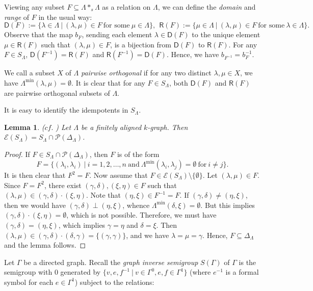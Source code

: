 \documentclass[a4paper,reqno,11pt]{amsart}
\numberwithin{equation}{section}
\newtheorem{lem}[thm]{Lemma}
\theoremstyle{definition}
\theoremstyle{remark}
\begin{document}
Viewing any subset $F\subseteq \Lambda *_s \Lambda$ as a relation on $\Lambda$, we can define the \emph{domain} and \emph{range} of $F$ in the usual way: \[\mathsf{D}(F):=\{\lambda\in \Lambda~|~(\lambda,\mu)\in F~\text{for some}~\mu\in \Lambda\},~~\mathsf{R}(F):=\{\mu\in \Lambda~|~(\lambda,\mu)\in F~\text{for some}~\lambda\in \Lambda\}.\] Observe that the map $b_F$, sending each element $\lambda\in \mathsf{D}(F)$ to the unique element $\mu\in \mathsf{R}(F)$ such that $(\lambda,\mu)\in F$, is a bijection from $\mathsf{D}(F)$ to $\mathsf{R}(F)$. For any $F\in S_\Lambda$, $\mathsf{D}(F^{-1})=\mathsf{R}(F)$ and $\mathsf{R}(F^{-1})=\mathsf{D}(F)$. Hence, we have $b_{F^{-1}}=b_F^{-1}$. 

We call a subset $X$ of $\Lambda$ \emph{pairwise orthogonal} if for any two distinct $\lambda,\mu\in X$, we have $\Lambda^{\min}(\lambda,\mu)=\emptyset$. It is clear that for any $F\in S_\Lambda$, both $\mathsf{D}(F)$ and $\mathsf{R}(F)$ are pairwise orthogonal subsets of $\Lambda$.   

It is easy to identify the idempotents in $S_\Lambda$. 
\begin{lem}\label{lem idempotents of the semigroup}
\textup{($cf.$ \cite[Corollary 3.5]{Larki})} Let $\Lambda$ be a finitely aligned $k$-graph. Then $\mathcal{E}(S_\Lambda)=S_\Lambda \cap \mathcal{P}(\Delta_\Lambda)$.  
\end{lem}
\begin{proof}
If $F\in S_\Lambda \cap \mathcal{P}(\Delta_\Lambda)$, then $F$ is of the form \[F=\{(\lambda_i,\lambda_i)~|~i=1,2,\ldots,n~\text{and}~\Lambda^{\min}(\lambda_i,\lambda_j)=\emptyset~\text{for}~i\neq j\}.\] It is then clear that $F^2=F$. Now assume that $F\in \mathcal{E}(S_\Lambda)\setminus \{\emptyset\}$. Let $(\lambda,\mu)\in F$. Since $F=F^2$, there exist $(\gamma,\delta),(\xi,\eta)\in F$ such that $(\lambda,\mu)\in (\gamma,\delta)\cdot (\xi,\eta)$. Note that $(\eta,\xi)\in F^{-1}=F$. If $(\gamma,\delta)\neq (\eta,\xi)$, then we would have $(\gamma,\delta)\perp (\eta,\xi)$, whence $\Lambda^{\min}(\delta,\xi)=\emptyset$. But this implies $(\gamma,\delta)\cdot (\xi,\eta)=\emptyset$, which is not possible. Therefore, we must have $(\gamma,\delta)=(\eta,\xi)$, which implies $\gamma=\eta$ and $\delta=\xi$. Then $(\lambda,\mu)\in (\gamma,\delta)\cdot (\delta,\gamma)=\{(\gamma,\gamma)\}$, and we have $\lambda=\mu=\gamma$. Hence, $F\subseteq \Delta_\Lambda$ and the lemma follows.   
\end{proof}

Let $\Gamma$ be a directed graph. Recall the \emph{graph inverse semigroup} \cite{Ash-Hall, Jones, Mesyan} $S(\Gamma)$ of $\Gamma$ is the semigroup with $0$ generated by $\{v,e,f^{-1}~|~v\in \Gamma^0,e,f\in\Gamma^1\}$ (where $e^{-1}$ is a formal symbol for each $e\in \Gamma^1$) subject to the relations:
\end{document}
